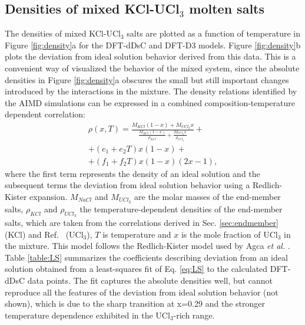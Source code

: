 \documentclass[preprint,3p,10pt,twocolumn,number,sort&compress]{elsarticle}
\begin{document}
\subsection{Densities of mixed KCl-UCl$_3$ molten salts}
The densities of mixed KCl-UCl$_3$ salts are plotted as a function of temperature in Figure \ref{fig:density}a for the DFT-dDsC and DFT-D3 models. Figure \ref{fig:density}b plots the deviation from ideal solution behavior derived from this data. This is a convenient way of visualized the behavior of the mixed system, since the absolute densities in Figure \ref{fig:density}a obscures the small but still important changes introduced by the interactions in the mixture. The density relations identified by the AIMD simulations can be expressed in a combined composition-temperature dependent correlation:
\begin{equation}
\begin{split}
\rho(x,T)=\frac{M_{KCl}(1-x)+M_{UCl_3}x}{\frac{M_{KCl}(1-x)}{\rho_{KCl}}+\frac{M_{UCl_3}x}{\rho_{UCl_3}}}+ \\
+(e_1+e_2T)x(1-x)+\\
+(f_1+f_2T)x(1-x)(2x-1), 
\label{eq:LS}
\end{split}
\end{equation}
\noindent where the first term represents the density of an ideal solution and the subsequent terms the deviation from ideal solution behavior using a Redlich-Kister expansion. $M_{NaCl}$ and $M_{UCl_3}$ are the molar masses of the end-member salts, $\rho_{KCl}$ and $\rho_{UCl_3}$ the temperature-dependent densities of the end-member salts, which are taken from the correlations derived in Sec. \ref{sec:endmember} (KCl) and Ref.~\cite{Andersson} (UCl$_3$), $T$ is temperature and $x$ is the mole fraction of UCl$_3$ in the mixture. This model follows the Redlich-Kister model used by Agca \textit{et al.} \cite{agca2022}. Table \ref{table:LS} summarizes the coefficients describing deviation from an ideal solution obtained from a least-squares fit of Eq. \ref{eq:LS} to the calculated DFT-dDsC data points. 
The fit captures the absolute densities well, but cannot reproduce all the features of the deviation from ideal solution behavior (not shown), which is due to the sharp transition at x=0.29 and the stronger temperature dependence exhibited in the UCl$_3$-rich range.
\end{document}
